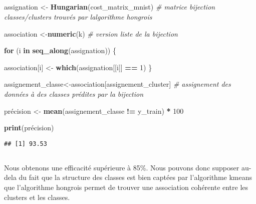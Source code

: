 \documentclass[
]{article}
\newenvironment{Shaded}{\begin{snugshade}}{\end{snugshade}}
\newcommand{\CommentTok}[1]{\textcolor[rgb]{0.56,0.35,0.01}{\textit{#1}}}
\newcommand{\ControlFlowTok}[1]{\textcolor[rgb]{0.13,0.29,0.53}{\textbf{#1}}}
\newcommand{\DecValTok}[1]{\textcolor[rgb]{0.00,0.00,0.81}{#1}}
\newcommand{\FunctionTok}[1]{\textcolor[rgb]{0.13,0.29,0.53}{\textbf{#1}}}
\newcommand{\NormalTok}[1]{#1}
\newcommand{\OtherTok}[1]{\textcolor[rgb]{0.56,0.35,0.01}{#1}}
\newcommand{\SpecialCharTok}[1]{\textcolor[rgb]{0.81,0.36,0.00}{\textbf{#1}}}
\begin{document}
\hypertarget{section-2}{%
\subsection{}\label{section-2}}

\begin{Shaded}
\begin{Highlighting}[]
\NormalTok{assignation }\OtherTok{\textless{}{-}} \FunctionTok{Hungarian}\NormalTok{(cost\_matrix\_mnist) }\CommentTok{\# matrice bijection classes/clusters trouvés par l\textquotesingle{}algorithme hongrois}

\NormalTok{association }\OtherTok{\textless{}{-}}\FunctionTok{numeric}\NormalTok{(k) }\CommentTok{\# version liste de la bijection}

\ControlFlowTok{for}\NormalTok{ (i }\ControlFlowTok{in} \FunctionTok{seq\_along}\NormalTok{(assignation)) \{}
  
\NormalTok{  association[i] }\OtherTok{\textless{}{-}} \FunctionTok{which}\NormalTok{(assignation[[i]] }\SpecialCharTok{==} \DecValTok{1}\NormalTok{)}
\NormalTok{\}}

\NormalTok{assignement\_classe}\OtherTok{\textless{}{-}}\NormalTok{association[assignement\_cluster] }\CommentTok{\# assignement des données à des classes prédites par la bijection}

\NormalTok{précision }\OtherTok{\textless{}{-}} \FunctionTok{mean}\NormalTok{(assignement\_classe }\SpecialCharTok{!=}\NormalTok{ y\_train) }\SpecialCharTok{*} \DecValTok{100} 

\FunctionTok{print}\NormalTok{(précision)}
\end{Highlighting}
\end{Shaded}

\begin{verbatim}
## [1] 93.53
\end{verbatim}

\hypertarget{section-3}{%
\subsection{}\label{section-3}}

Nous obtenons une efficacité supérieure à 85\%. Nous pouvons donc
supposer au-dela du fait que la structure des classes est bien captées
par l'algorithme kmeans que l'algorithme hongrois permet de trouver une
association cohérente entre les clusters et les classes.

\hypertarget{section-4}{%
\subsection{}\label{section-4}}
\end{document}
